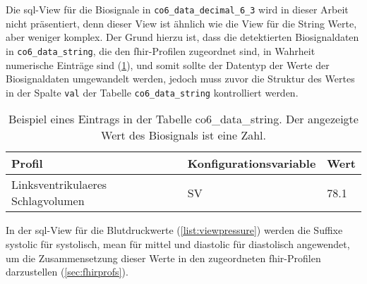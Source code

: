 Die \ac{sql}-View für die Biosignale in \texttt{co6\_data\_decimal\_6\_3} wird in dieser Arbeit nicht präsentiert, denn dieser View ist ähnlich wie die View für die String Werte, aber weniger komplex. Der Grund hierzu ist, dass die detektierten Biosignaldaten in \texttt{co6\_data\_string}, die den \ac{fhir}-Profilen zugeordnet sind, in Wahrheit numerische Einträge sind (\ref{tab:stringvalue}), und somit sollte der Datentyp der Werte der Biosignaldaten umgewandelt werden, jedoch muss zuvor die Struktur des Wertes in der Spalte \texttt{val} der Tabelle \texttt{co6\_data\_string} kontrolliert werden.
\clearpage
\begin{table}[ht]
	\centering 
	\caption[Eintrag in der Tabelle co6\_data\_string]{Beispiel eines Eintrags in der Tabelle co6\_data\_string. Der angezeigte Wert des Biosignals ist eine Zahl.}
	\label{tab:stringvalue}
	\begin{tabular}{|l|l|l|}
		\hline
		\rowcolor{lightgray} Profil & Konfigurationsvariable & Wert \\ \hline
		Linksventrikulaeres Schlagvolumen & SV & 78.1 \\ \hline
	\end{tabular}
\end{table}

In der \ac{sql}-View für die Blutdruckwerte (\ref{list:viewpressure}) werden die Suffixe \glqq systolic\grqq{} für systolisch, \glqq mean\grqq{} für mittel und \glqq diastolic\grqq{} für diastolisch angewendet, um die Zusammensetzung dieser Werte in den zugeordneten \ac{fhir}-Profilen darzustellen (\ref{sec:fhirprofs}). 

